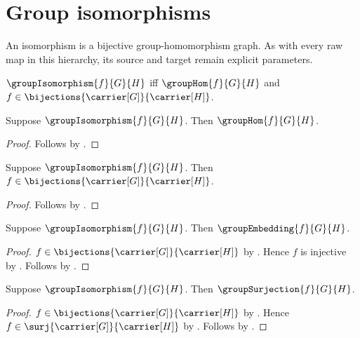 

\section{Group isomorphisms}

An isomorphism is a bijective group-homomorphism graph.  As with every raw
map in this hierarchy, its source and target remain explicit parameters.

\begin{definition}\label{group_isomorphism}
    $\groupIsomorphism{f}{G}{H}$ iff
        $\groupHom{f}{G}{H}$ and
        $f\in\bijections{\carrier[G]}{\carrier[H]}$.
\end{definition}

\begin{proposition}\label{group_isomorphism_is_hom}
    Suppose $\groupIsomorphism{f}{G}{H}$.
    Then $\groupHom{f}{G}{H}$.
\end{proposition}
\begin{proof}
    Follows by .
\end{proof}

\begin{proposition}\label{group_isomorphism_is_bijection}
    Suppose $\groupIsomorphism{f}{G}{H}$.
    Then $f\in\bijections{\carrier[G]}{\carrier[H]}$.
\end{proposition}
\begin{proof}
    Follows by .
\end{proof}

\begin{corollary}\label{group_isomorphism_is_embedding}
    Suppose $\groupIsomorphism{f}{G}{H}$.
    Then $\groupEmbedding{f}{G}{H}$.
\end{corollary}
\begin{proof}
    $f\in\bijections{\carrier[G]}{\carrier[H]}$ by
        .
    Hence $f$ is injective by .
    Follows by
        .
\end{proof}

\begin{corollary}\label{group_isomorphism_is_surjection}
    Suppose $\groupIsomorphism{f}{G}{H}$.
    Then $\groupSurjection{f}{G}{H}$.
\end{corollary}
\begin{proof}
    $f\in\bijections{\carrier[G]}{\carrier[H]}$ by
        .
    Hence $f\in\surj{\carrier[G]}{\carrier[H]}$ by .
    Follows by
        .
\end{proof}

